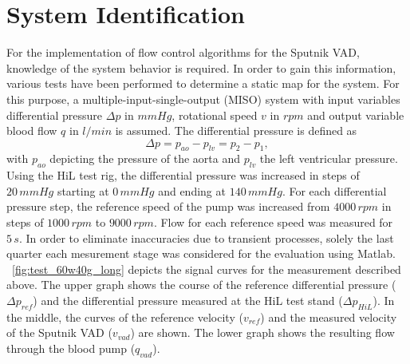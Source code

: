 \section{System Identification}
For the implementation of flow control algorithms for the Sputnik VAD, knowledge of the system behavior is required. In order to gain this information, various tests have been performed to determine a static map for the system. For this purpose, a multiple-input-single-output (MISO) system with input variables differential pressure $\Delta{p}$ in $mmHg$, rotational speed $v$ in $rpm$ and output variable blood flow $q$ in $l/min$ is assumed. The differential pressure is defined as
\begin{equation}
  \Delta{p} = p_{ao} - p_{lv} = p_2 - p_1,
\end{equation}
with $p_{ao}$ depicting the pressure of the aorta and $p_{lv}$ the left ventricular pressure.
\\Using the HiL test rig, the differential pressure was increased in steps of $20\, mmHg$ starting at $0\,mmHg$ and ending at $140\,mmHg$. For each differential pressure step, the reference speed of the pump was increased from $4000\, rpm$ in steps of $1000\, rpm$ to $9000\, rpm$. Flow for each reference speed was measured for $5\, s$. In order to eliminate inaccuracies due to transient processes, solely the last quarter each mesurement stage was considered for the evaluation using Matlab. \figurename~\ref{fig:test_60w40g_long} depicts the signal curves for the measurement described above. The upper graph shows the course of the reference differential pressure ($\Delta{p_{ref}}$) and the differential pressure measured at the HiL test stand ($\Delta{p_{HiL}}$).
In the middle, the curves of the reference velocity ($v_{ref}$) and the measured velocity of the Sputnik VAD ($v_{vad}$) are shown. The lower graph shows the resulting flow through the blood pump ($q_{vad}$).


